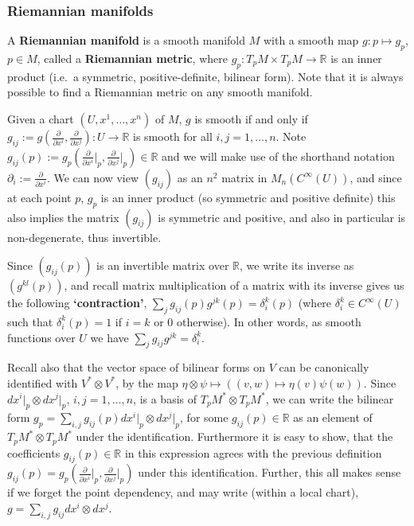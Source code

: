 \documentclass[a4paper]{article}
\theoremstyle{definition} \newtheorem*{definition}{Definition}
\theoremstyle{definition} \newtheorem*{definitions}{Definitions}
\theoremstyle{plain} \newtheorem{theorem}{Theorem}[section]
\theoremstyle{plain} \newtheorem{proposition}[theorem]{Proposition}
\theoremstyle{plain} \newtheorem{corollary}[theorem]{Corollary}
\theoremstyle{plain} \newtheorem{lemma}[theorem]{Lemma}
\theoremstyle{plain} \newtheorem{example}[theorem]{Example}
\newcommand{\defn}[1]{\textbf{#1}}
\newcommand{\realnos}{\mathbb{R}}
\begin{document}
\subsubsection{Riemannian manifolds}
A \defn{Riemannian manifold} is a smooth manifold $M$ with a smooth map $g:p\mapsto g_p$, $p\in M$, called a \defn{Riemannian metric}, where $g_p:T_pM\times T_pM\to \realnos$ is an inner product (i.e.\ a symmetric, positive-definite, bilinear form).
Note that it is always possible to find a Riemannian metric on any smooth manifold.

Given a chart $(U, x^1, \ldots, x^n)$ of $M$, $g$ is smooth if and only if $g_{ij}:=g(\frac{\partial}{\partial x^i}, \frac{\partial}{\partial x^j}):U\to \realnos$ is smooth for all $i,j=1,\ldots, n$. Note $g_{ij}(p):=g_p(\frac{\partial}{\partial x^i}\vert_p, \frac{\partial}{\partial x^j}\vert_p) \in \realnos$ and we will make use of the shorthand notation $\partial_i:=\frac{\partial}{\partial x^i}$. We can now view $(g_{ij})$ as an $n^2$ matrix in $M_n(C^\infty (U))$, and since at each point $p$, $g_p$ is an inner product (so symmetric and positive definite) this also implies the matrix $(g_{ij})$ is symmetric and positive, and also in particular is non-degenerate, thus invertible.

Since $(g_{ij}(p))$ is an invertible matrix over $\realnos$, we write its inverse as $(g^{kl}(p))$, and recall matrix multiplication of a matrix with its inverse gives us the following \defn{`contraction'},
$\sum_j g_{ij}(p)g^{jk}(p)=\delta_i^k(p)$ (where $\delta_i^k\in C^\infty(U)$ such that $\delta_i^k(p)=1$ if $i=k$ or $0$ otherwise). In other words, as smooth functions over $U$ we have $\sum_j g_{ij}g^{jk}=\delta_i^k$. 

Recall also that the vector space of bilinear forms on $V$ can be canonically identified with $V^\ast \otimes V^\ast$, by the map $\eta\otimes \psi \mapsto ((v,w)\mapsto \eta(v)\psi(w))$. Since $dx^i\vert_p\otimes dx^j\vert_p$, $i,j=1,\ldots, n$, is a basis of $T_pM^\ast \otimes T_pM^\ast$, we can write the bilinear form $g_p=\sum_{i,j} g_{ij}(p)dx^i\vert_p \otimes dx^j\vert_p$, for some $g_{ij}(p)\in \realnos$ as an element of $T_pM^\ast \otimes T_pM^\ast$ under the identification. Furthermore it is easy to show, that the coefficients $g_{ij}(p)\in \realnos$ in this expression agrees with the previous definition $g_{ij}(p)=g_p(\frac{\partial}{\partial x^i}\vert_p, \frac{\partial}{\partial x^j}\vert_p)$ under this identification. Further, this all makes sense if we forget the point dependency, and may write (within a local chart), $g=\sum_{i,j}g_{ij} dx^i\otimes dx^j$. 
\end{document}
